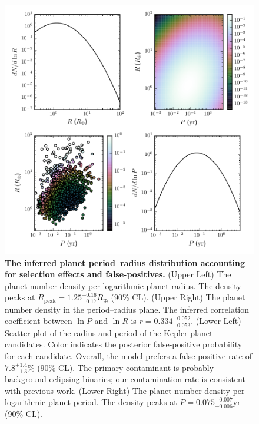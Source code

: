 \documentclass[12pt]{article}
\newcommand{\Rpeak}{R_\mathrm{peak}}
\newcommand{\REarth}{R_\oplus}
\newcommand{\rpeakrange}{1.25_{-0.17}^{+0.16}}
\newcommand{\corrcoeffrange}{0.334_{-0.053}^{+0.052}}
\newcommand{\fposrange}{7.8_{-1.3}^{+1.4}\%}
\newcommand{\ppeakrange}{0.075_{-0.006}^{+0.007}}
\begin{document}
\begin{figure}
  \includegraphics[width=\columnwidth]{foreground-dist}
  \caption{\label{fig:foreground-dist} \textbf{The inferred planet
      period--radius distribution accounting for selection effects and
      false-positives.}  (Upper Left) The planet number density per
    logarithmic planet radius.  The density peaks at $\Rpeak =
    \rpeakrange \REarth$ (90\% CL).  (Upper Right) The planet number
    density in the period--radius plane.  The inferred correlation
    coefficient between $\ln P$ and $\ln R$ is $r = \corrcoeffrange$.
    (Lower Left) Scatter plot of the radius and period of the Kepler
    planet candidates.  Color indicates the posterior false-positive
    probability for each candidate.  Overall, the model prefers a
    false-positive rate of $\fposrange$ (90\% CL).  The primary
    contaminant is probably background eclipsing binaries; our
    contamination rate is consistent with previous
    work\cite{Fressin2013}. (Lower Right) The planet number density
    per logarithmic planet period.  The density peaks at $P =
    \ppeakrange \mathrm{yr}$ (90\% CL). }
\end{figure}
\end{document}

